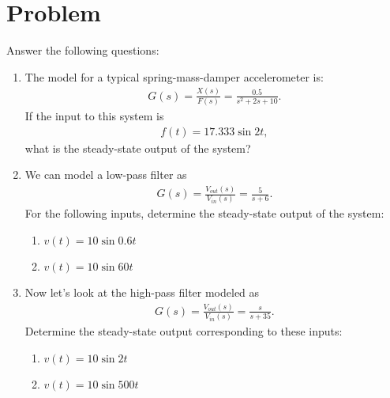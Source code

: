 \documentclass[11pt, reqno]{article}    %
\begin{document}
\section{Problem} Answer the following questions:
\begin{enumerate}
    \item The model for a typical spring-mass-damper accelerometer is:
    \begin{align*}
         G(s) = \frac{X(s)}{F(s)} = \frac{0.5}{s^2 + 2 s + 10} .
    \end{align*}
    If the input to this system is
    \begin{align*}
        f(t) = 17.333 \sin 2 t ,
    \end{align*}
    what is the steady-state output of the system?
    \item We can model a low-pass filter as
    \begin{align*}
        G(s) = \frac{V_{out}(s)}{V_{in}(s)} = \frac{5}{s + 6} .
    \end{align*}
    For the following inputs, determine the steady-state output of the system:
    \begin{enumerate}
        \item \( v(t) = 10 \sin 0.6 t\)
        \item \( v(t) = 10 \sin 60 t\)
    \end{enumerate}
    \item Now let's look at the high-pass filter modeled as
    \begin{align*}
        G(s) = \frac{V_{out}(s)}{V_{in}(s)} = \frac{s}{s + 35} .
    \end{align*}
    Determine the steady-state output corresponding to these inputs:
    \begin{enumerate}
        \item \( v(t) = 10 \sin 2 t\)
        \item \( v(t) = 10 \sin 500 t\)
    \end{enumerate}

\end{enumerate}
\end{document}
